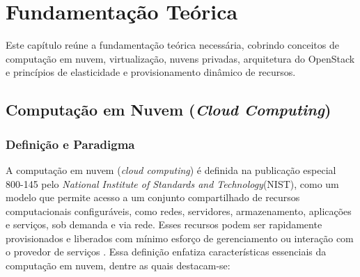 \chapter{Fundamentação Teórica}
\setcounter{table}{0}

Este capítulo reúne a fundamentação teórica necessária, cobrindo conceitos de computação em nuvem, virtualização, nuvens privadas, arquitetura do OpenStack e princípios de elasticidade e provisionamento dinâmico de recursos.

\section{Computação em Nuvem (\textit{Cloud Computing})}
\label{sec:cloud-computing}

\subsection{Definição e Paradigma}

A computação em nuvem (\textit{cloud computing}) é definida na publicação especial 800-145 pelo \textit{National Institute of Standards and Technology}(NIST), como um modelo que permite acesso a um conjunto compartilhado de recursos computacionais configuráveis, como redes, servidores, armazenamento, aplicações e serviços,  sob demanda e via rede. Esses recursos podem ser rapidamente provisionados e liberados com mínimo esforço de gerenciamento ou interação com o provedor de serviços \cite{mell2011}. Essa definição enfatiza características essenciais da computação em nuvem, dentre as quais destacam-se:

